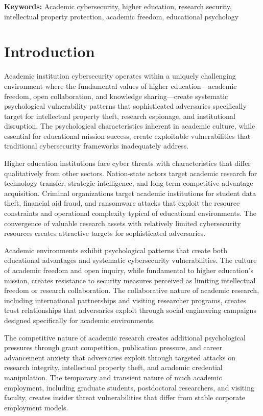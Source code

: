 \documentclass[10pt, twocolumn]{article}
\begin{document}
\textbf{Keywords:} Academic cybersecurity, higher education, research security, intellectual property protection, academic freedom, educational psychology

\section{Introduction}

Academic institution cybersecurity operates within a uniquely challenging environment where the fundamental values of higher education—academic freedom, open collaboration, and knowledge sharing—create systematic psychological vulnerability patterns that sophisticated adversaries specifically target for intellectual property theft, research espionage, and institutional disruption. The psychological characteristics inherent in academic culture, while essential for educational mission success, create exploitable vulnerabilities that traditional cybersecurity frameworks inadequately address.

Higher education institutions face cyber threats with characteristics that differ qualitatively from other sectors. Nation-state actors target academic research for technology transfer, strategic intelligence, and long-term competitive advantage acquisition. Criminal organizations target academic institutions for student data theft, financial aid fraud, and ransomware attacks that exploit the resource constraints and operational complexity typical of educational environments. The convergence of valuable research assets with relatively limited cybersecurity resources creates attractive targets for sophisticated adversaries.

Academic environments exhibit psychological patterns that create both educational advantages and systematic cybersecurity vulnerabilities. The culture of academic freedom and open inquiry, while fundamental to higher education's mission, creates resistance to security measures perceived as limiting intellectual freedom or research collaboration. The collaborative nature of academic research, including international partnerships and visiting researcher programs, creates trust relationships that adversaries exploit through social engineering campaigns designed specifically for academic environments.

The competitive nature of academic research creates additional psychological pressures through grant competition, publication pressure, and career advancement anxiety that adversaries exploit through targeted attacks on research integrity, intellectual property theft, and academic credential manipulation. The temporary and transient nature of much academic employment, including graduate students, postdoctoral researchers, and visiting faculty, creates insider threat vulnerabilities that differ from stable corporate employment models.
\end{document}
